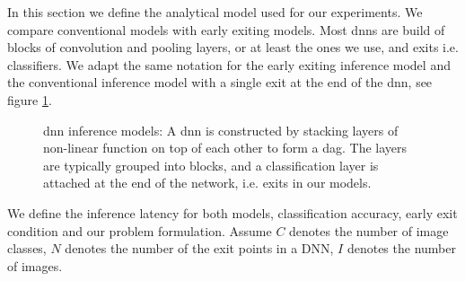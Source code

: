 In this section we define the analytical model used for our experiments. We compare conventional models with early exiting models. Most \gls{dnn}s are build of blocks of convolution and pooling layers, or at least the ones we use, and exits i.e. classifiers. We adapt the same notation for the early exiting inference model and the conventional inference model with a single exit at the end of the \gls{dnn}, see figure \ref{fig:inference_models}.
	\begin{figure}
		\centering
		\captionsetup[subfigure]{justification=centering, farskip=1pt,captionskip=1pt}
		\hfill
		\caption[\gls{dnn} structure]{\gls{dnn} inference models: A \gls{dnn} is constructed by stacking layers of non-linear function on top of each other to form a \gls{dag}. The layers are typically grouped into blocks, and a classification layer is attached at the end of the network, i.e. exits in our models.}
		\label{fig:inference_models}
	\end{figure}	
	We define the inference latency for both models, classification accuracy, early exit condition and our problem formulation. Assume $ C $ denotes the number of image classes, $ N $ denotes the number of the exit points in a DNN, $ I $ denotes the number of images.

